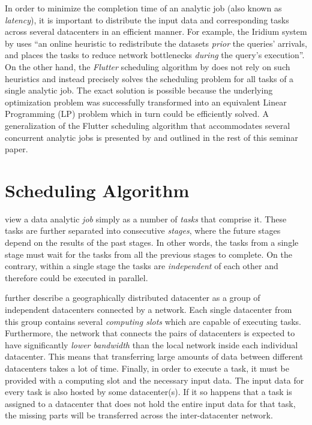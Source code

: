 In order to minimize the completion time of an analytic job (also known as \emph{latency}), it is important to distribute the input data and corresponding tasks across several datacenters in an efficient manner. For example, the Iridium system by \citet{Pu2015} uses ``an online heuristic to redistribute the datasets \emph{prior} the queries' arrivals, and places the tasks to reduce network bottlenecks \emph{during} the query's execution''. On the other hand, the \emph{Flutter} scheduling algorithm by \citet{Hu2016} does not rely on such heuristics and instead precisely solves the scheduling problem for all tasks of a single analytic job. The exact solution is possible because the underlying optimization problem was successfully transformed into an equivalent Linear Programming (LP) problem which in turn could be efficiently solved. A generalization of the Flutter scheduling algorithm that accommodates several concurrent analytic jobs is presented by \citet{Chen2017} and outlined in the rest of this seminar paper.

\section{Scheduling Algorithm}
\label{sec:scheduling-algorithm}

\citet{Chen2017} view a data analytic \emph{job} simply as a number of \emph{tasks} that comprise it. These tasks are further separated into consecutive \emph{stages}, where the future stages depend on the results of the past stages. In other words, the tasks from a single stage must wait for the tasks from all the previous stages to complete. On the contrary, within a single stage the tasks are \emph{independent} of each other and therefore could be executed in parallel.

\citet{Chen2017} further describe a geographically distributed datacenter as a group of independent datacenters connected by a network. Each single datacenter from this group contains several \emph{computing slots} which are capable of executing tasks. Furthermore, the network that connects the pairs of datacenters is expected to have significantly \emph{lower bandwidth} than the local network inside each individual datacenter. This means that transferring large amounts of data between different datacenters takes a lot of time. Finally, in order to execute a task, it must be provided with a computing slot and the necessary input data. The input data for every task is also hosted by some datacenter(s). If it so happens that a task is assigned to a datacenter that does not hold the entire input data for that task, the missing parts will be transferred across the inter-datacenter network.

